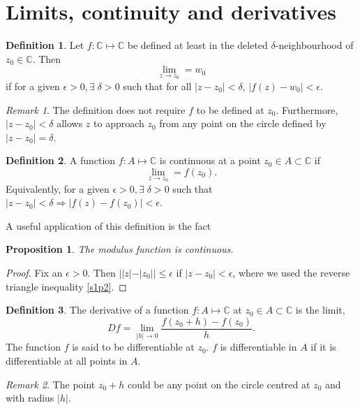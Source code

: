 \documentclass{article}
\theoremstyle{plain}
\numberwithin{thm}{section}
\theoremstyle{plain}
\newtheorem{prop}{Proposition}
\numberwithin{prop}{section}
\theoremstyle{plain}
\numberwithin{prop}{section}
\theoremstyle{definition}
\newtheorem{defn}{Definition}
\numberwithin{defn}{section}
\theoremstyle{remark}
\newtheorem*{rem}{Remark}
\numberwithin{equation}{section}
\begin{document}
\section{Limits, continuity and derivatives}\label{s2}
\begin{defn}\label{s2d1}
Let $f: \mathbb{C} \mapsto \mathbb{C}$ be defined at least in the deleted
$\delta$-neighbourhood of $z_0 \in \mathbb{C}$. Then 
\[
\lim_{z \rightarrow z_0} = w_0
\]
if for a given $\epsilon > 0, \exists\;\delta > 0$ such that for all $|z - z_0| 
< \delta$, $|f(z) - w_0| < \epsilon$.
\end{defn}
\begin{rem}
The definition does not require $f$ to be defined at $z_0$. Furthermore, $|z -
z_0| < \delta$ allows $z$ to approach $z_0$ from any point on the circle 
defined by $|z - z_0| = \delta$.
\end{rem}

\begin{defn}\label{s2d2}
A function $f:A \mapsto \mathbb{C}$ is continuous at a point $z_0 \in A 
\subset \mathbb{C}$ if
\[
\lim_{z \rightarrow z_0} = f(z_0).
\]
Equivalently, for a given $\epsilon > 0, \exists\;\delta > 0$ such that 
$|z - z_0| < \delta \Rightarrow |f(z) - f(z_0)| < \epsilon$.
\end{defn}

A useful application of this definition is the fact
\begin{prop}\label{s2p1}
The modulus function is continuous.
\end{prop}
\begin{proof}
Fix an $\epsilon > 0$. Then $||z| - |z_0|| \le \epsilon$ if $|z - z_0| <
\epsilon$, where we used the reverse triangle inequality \ref{s1p2}.
\end{proof}

\begin{defn}\label{s2d3}
The derivative of a function $f: A \mapsto \mathbb{C}$ at $z_0 \in A \subset
\mathbb{C}$ is the limit,
\[
Df = \lim_{|h| \rightarrow 0}\frac{f(z_0 + h) - f(z_0)}{h}.
\]
The function $f$ is said to be differentiable at $z_0$. $f$ is differentiable
in $A$ if it is differentiable at all points in $A$.
\end{defn}
\begin{rem}
The point $z_0 + h$ could be any point on the circle centred at $z_0$ and with
radius $|h|$.
\end{rem}
\end{document}
